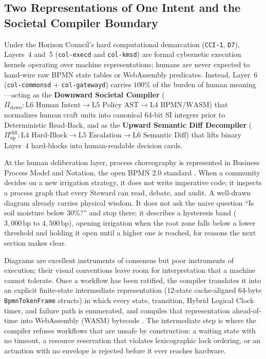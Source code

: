 \subsection{Two Representations of One Intent and the Societal Compiler Boundary}

Under the Horizon Council's hard computational demarcation (\texttt{CCI-1}, \texttt{D7}), Layers~4 and~5 (\texttt{col-execd} and \texttt{col-kmsd}) are formal cybernetic execution kernels operating over machine representations; humans are never expected to hand-wire raw BPMN state tables or WebAssembly predicates. Instead, Layer~6 (\texttt{col-commonsd} + \texttt{col-gatewayd}) carries $100\%$ of the burden of human meaning---acting as the \textbf{Downward Societal Compiler} ($\Pi_{\mathrm{down}} : \text{L6 Human Intent} \to \text{L5 Policy AST} \to \text{L4 BPMN/WASM}$) that normalizes human craft units into canonical 64-bit SI integers prior to Deterministic Read-Back, and as the \textbf{Upward Semantic Diff Decompiler} ($\Pi_{\mathrm{up}}^{\mathrm{diff}} : \text{L4 Hard-Block} \to \text{L5 Escalation} \to \text{L6 Semantic Diff}$) that lifts binary Layer~4 hard-blocks into human-readable decision cards.

At the human deliberation layer, process choreography is represented in Business Process Model and Notation, the open BPMN 2.0 standard \parencite{omg2011bpmn}. When a community decides on a new irrigation strategy, it does not write imperative code; it inspects a process graph that every Steward can read, debate, and audit. A well-drawn diagram already carries physical wisdom. It does not ask the naive question ``Is soil moisture below 30\%?'' and stop there; it describes a hysteresis band ($3{,}000\,\mathrm{bp}$ to $4{,}500\,\mathrm{bp}$), opening irrigation when the root zone falls below a lower threshold and holding it open until a higher one is reached, for reasons the next section makes clear.

Diagrams are excellent instruments of consensus but poor instruments of execution; their visual conventions leave room for interpretation that a machine cannot tolerate. Once a workflow has been ratified, the compiler translates it into an explicit finite-state intermediate representation (12-state cache-aligned 64-byte \texttt{BpmnTokenFrame} structs) in which every state, transition, Hybrid Logical Clock timer, and failure path is enumerated, and compiles that representation ahead-of-time into WebAssembly (WASM) bytecode \parencite{haas2017wasm}. The intermediate step is where the compiler refuses workflows that are unsafe by construction: a waiting state with no timeout, a resource reservation that violates lexicographic lock ordering, or an actuation with no envelope is rejected before it ever reaches hardware.


